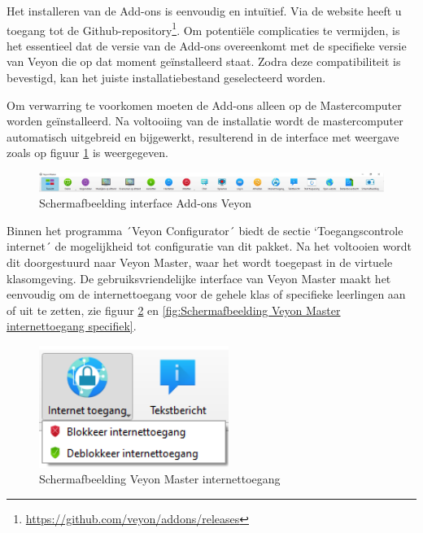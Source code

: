 Het installeren van de Add-ons is eenvoudig en intuïtief. Via de website heeft u toegang tot de Github-repository\footnote{\url{https://github.com/veyon/addons/releases}}. Om potentiële complicaties te vermijden, is het essentieel dat de versie van de Add-ons overeenkomt met de specifieke versie van Veyon die op dat moment geïnstalleerd staat. Zodra deze compatibiliteit is bevestigd, kan het juiste installatiebestand geselecteerd worden.\newline

Om verwarring te voorkomen moeten de Add-ons alleen op de Mastercomputer worden geïnstalleerd. Na voltooiing van de installatie wordt de mastercomputer automatisch uitgebreid en bijgewerkt, resulterend in de interface met weergave zoals op figuur \ref{fig:Schermafbeelding interface Add-ons Veyon} is weergegeven. 

\begin{figure}[h]
    \centering
    \includegraphics[width=1\textwidth]{graphics/SchermafbeeldingVeyonMasterInterface.png}
    \caption{Schermafbeelding interface Add-ons Veyon}
    \label{fig:Schermafbeelding interface Add-ons Veyon} 
\end{figure}

Binnen het programma ´Veyon Configurator´ biedt de sectie `Toegangscontrole internet´ de mogelijkheid tot configuratie van dit pakket. Na het voltooien wordt dit doorgestuurd naar Veyon Master, waar het wordt toegepast in de virtuele klasomgeving. De gebruiksvriendelijke interface van Veyon Master maakt het eenvoudig om de internettoegang voor de gehele klas of specifieke leerlingen aan of uit te zetten, zie figuur \ref{fig:Schermafbeelding Veyon Master internettoegang} en \ref{fig:Schermafbeelding Veyon Master internettoegang specifiek}.

\begin{figure}[h]
    \centering
    \includegraphics[width=0.55\textwidth]{graphics/SchermafbeeldingVeyonMasterInternettoegang.png}
    \caption{Schermafbeelding Veyon Master internettoegang}
    \label{fig:Schermafbeelding Veyon Master internettoegang} 
\end{figure}

